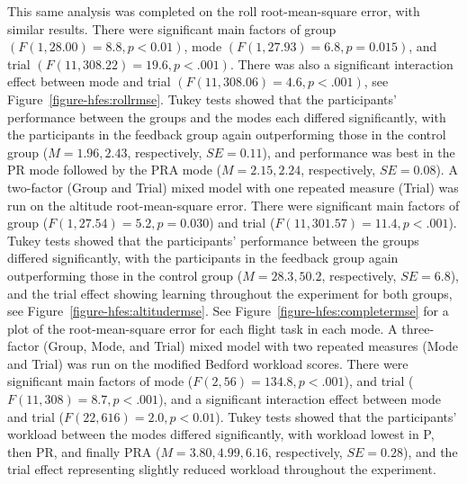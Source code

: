 This same analysis was completed on the roll root-mean-square error, with similar results.
There were significant main factors of group $(F(1, 28.00) = 8.8, p < 0.01)$, mode $(F(1, 27.93) = 6.8, p = 0.015)$, and trial $(F(11, 308.22) = 19.6, p < .001)$.
There was also a significant interaction effect between mode and trial $(F(11, 308.06) = 4.6, p < .001)$, see Figure~\ref{figure-hfes:rollrmse}.
Tukey tests showed that the participants' performance between the groups and the modes each differed significantly, with the participants in the feedback group again outperforming those in the control group ($M = 1.96, 2.43$, respectively, $SE = 0.11$), and performance was best in the PR mode followed by the PRA mode ($M = 2.15, 2.24$, respectively, $SE = 0.08$).
A two-factor (Group and Trial) mixed model with one repeated measure (Trial) was run on the altitude root-mean-square error.
There were significant main factors of group ($F(1, 27.54) = 5.2, p = 0.030$) and trial ($F(11, 301.57) = 11.4, p < .001$).
Tukey tests showed that the participants' performance between the groups differed significantly, with the participants in the feedback group again outperforming those in the control group ($M = 28.3, 50.2$, respectively, $SE = 6.8$), and the trial effect showing learning throughout the experiment for both groups, see Figure~\ref{figure-hfes:altitudermse}.
See Figure~\ref{figure-hfes:completermse} for a plot of the root-mean-square error for each flight task in each mode.
A three-factor (Group, Mode, and Trial) mixed model with two repeated measures (Mode and Trial) was run on the modified Bedford workload scores.
There were significant main factors of mode ($F(2, 56) = 134.8, p < .001$), and trial ($F(11, 308) = 8.7, p < .001$), and a significant interaction effect between mode and trial ($F(22, 616) = 2.0, p < 0.01$).
Tukey tests showed that the participants' workload between the modes differed significantly, with workload lowest in P, then PR, and finally PRA ($M = 3.80, 4.99, 6.16$, respectively, $SE = 0.28$), and the trial effect representing slightly reduced workload throughout the experiment.

